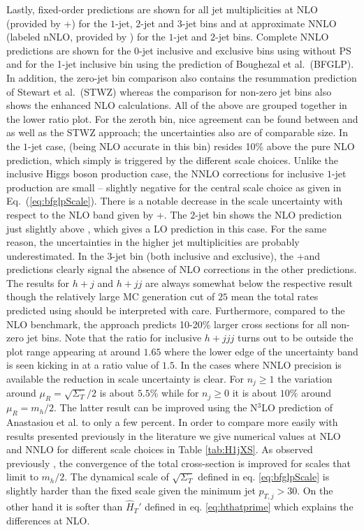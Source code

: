 Lastly, fixed-order predictions are shown for all jet multiplicities
at NLO (provided by \GoSam+\Sherpa) for the $1$-jet, $2$-jet and
$3$-jet bins and at approximate NNLO (labeled nNLO, provided by \Loopsim) 
for the $1$-jet and $2$-jet bins.
Complete NNLO predictions are shown for the 0-jet inclusive and
exclusive bins using \Sherpa without PS and for the 1-jet inclusive
bin using the prediction of Boughezal et al.~(BFGLP).
In addition, the zero-jet bin comparison
also contains the resummation prediction of Stewart et
al.~(STWZ) whereas the comparison for non-zero jet bins also
shows the \Minlo enhanced NLO calculations. All of the above are
grouped together in the lower ratio plot. For the zeroth bin, nice
agreement can be found between \Powheg and \Sherpa \NNLOPS as well as
the STWZ approach; the uncertainties also are of comparable
size. In the $1$-jet case, \Powheg (being NLO accurate in this bin)
resides 10\% above the pure NLO prediction, which simply is triggered
by the different scale choices. Unlike the inclusive Higgs boson
production case, the NNLO corrections for inclusive $1$-jet production
are small -- slightly negative for the central scale choice as given
in Eq.~(\ref{eq:bfglpScale}). There is a notable decrease in the scale
uncertainty with respect to the NLO band given by \GoSam+\Sherpa. The $2$-jet bin
shows the \GoSam NLO prediction just slightly above \Powheg, which
gives a LO prediction in this case. For the same reason, the \Powheg
uncertainties in the higher jet multiplicities are probably
underestimated. In the $3$-jet bin (both inclusive and exclusive), the
\GoSam+\Sherpa and \Sherpa \MEPSatNLO predictions clearly signal the absence of 
NLO corrections 
in the other predictions. The \Loopsim results for $h+j$ and
$h+jj$ are always somewhat below the respective \GoSam result
though the relatively large MC generation cut of $25$ \gev mean
the total rates predicted using \Loopsim should be interpreted with care.
Furthermore, compared to the NLO benchmark, the \Minlo approach
predicts 10-20\% larger cross sections for all non-zero jet bins.
Note that the \Minlo ratio for inclusive
$h+jjj$ turns out to be outside the plot range appearing at around
$1.65$ where the lower edge of the uncertainty band is seen kicking in
at a ratio value of $1.5$. In the cases where NNLO precision is available
the reduction in scale uncertainty is clear. For $n_j\geq1$ the variation around
$\mu_R=\sqrt{\Sigma_T}/2$ is about $5.5\%$ while for $n_j\geq0$ it is about $10\%$
around $\mu_R=m_h/2$. The latter result can be improved using the N${}^3$LO prediction
of Anastasiou et al. \cite{Anastasiou:2015ema} to only a few percent. In order to compare more
easily with results presented previously in the literature we give numerical values at NLO and NNLO
for different scale choices in Table \ref{tab:H1jXS}. As observed previously \cite{Boughezal:2015dra},
the convergence of the total cross-section is improved for scales that limit to $m_h/2$. The dynamical scale
of $\sqrt{\Sigma_T}$ defined in eq. \eqref{eq:bfglpScale} is slightly harder than the fixed scale given the
minimum jet $p_{T,j}>30$. On the other hand it is softer than $\hat{H}_T'$ defined in eq. \eqref{eq:hthatprime} which explains
the differences at NLO.

